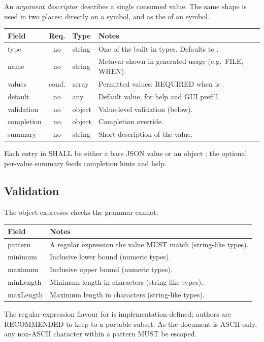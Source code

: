 An \emph{argument descriptor} describes a single consumed value. The same shape is used in two places: directly on a  symbol, and as the  of an  symbol.

\begin{tabulary}{\textwidth}{lclL}
Field & Req. & Type & Notes \\
\hline
type       & no    & string & One of the built-in types. Defaults to . \\
name       & no    & string & Metavar shown in generated usage (e.g.\ FILE, WHEN). \\
values     & cond. & array  & Permitted values; REQUIRED when  is . \\
default    & no    & any    & Default value, for help and GUI prefill. \\
validation & no    & object & Value-level validation (below). \\
completion & no    & object & Completion override. \\
summary    & no    & string & Short description of the value. \\
\end{tabulary}

Each entry in  SHALL be either a bare JSON value or an object ; the optional per-value summary feeds completion hints and help.

\subsection{Validation}

The  object expresses checks the grammar cannot:

\begin{tabulary}{\textwidth}{lL}
Field & Notes \\
\hline
pattern   & A regular expression the value MUST match (string-like types). \\
minimum   & Inclusive lower bound (numeric types). \\
maximum   & Inclusive upper bound (numeric types). \\
minLength & Minimum length in characters (string-like types). \\
maxLength & Maximum length in characters (string-like types). \\
\end{tabulary}

The regular-expression flavour for  is implementation-defined; authors are RECOMMENDED to keep to a portable subset. As the document is ASCII-only, any non-ASCII character within a pattern MUST be escaped.


